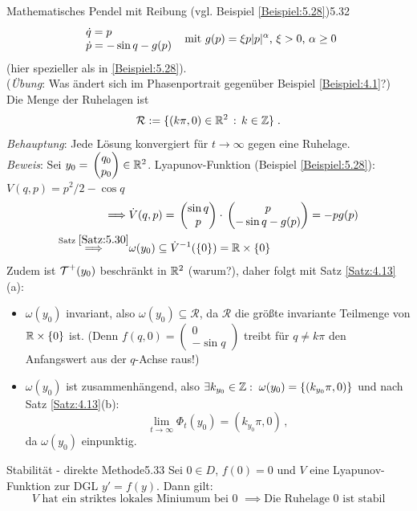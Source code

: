 \documentclass[a4paper]{article}
\begin{document}
\begin{Beispiel}{Mathematisches Pendel mit Reibung (vgl. Beispiel \ref{Beispiel:5.28})}{5.32}
\[
\begin{array}{l}
\dot{q}=p\\
\dot{p}=-\sin q-g(p)
\end{array}
\te{ mit $g(p)=\xi p|p|^{\alpha}$, $\xi>0$, $\alpha\ge 0$}
\]
(hier spezieller als in \ref{Beispiel:5.28}).\\
(\textit{Übung}: Was ändert sich im Phasenportrait gegenüber Beispiel \ref{Beispiel:4.1}?)\\
Die Menge der Ruhelagen ist
\[\mathcal{R}:=\{(k\pi,0)\in\mathbb R^2\,:\,k\in\operatorname{\mathbb Z}\}\;.\]
\textit{Behauptung}: Jede Lösung konvergiert für $t\to\infty$ gegen eine Ruhelage.\\
\textit{Beweis}: Sei $y_0=\mathop{}\begin{pmatrix}q_0\\p_0\end{pmatrix}\in\mathbb R^2$. Lyapunov-Funktion (Beispiel \ref{Beispiel:5.28}): $V(q,p)=p^2/2-\cos q$
\begin{align*}
\implies& \dot{V}(q,p)=\mathop{}\begin{pmatrix}\sin q\\p\end{pmatrix}\cdot \mathop{}\begin{pmatrix}p\\-\sin q-g(p)\end{pmatrix}=-pg(p)\\
\overset{\text{Satz } \ref{Satz:5.30}}{\implies}&\omega(y_0)\subseteq \dot{V}^{-1}(\{0\})=\mathbb R\times \{0\}
\end{align*}
Zudem ist $\operatorname{\mathcal{T}}^+(y_0)$ beschränkt in $\mathbb R^2$ (warum?), daher folgt mit Satz \ref{Satz:4.13}(a):
\begin{itemize}
\item $\omega(y_0)$ invariant, also $\omega(y_0)\subseteq \mathcal{R}$, da $\mathcal{R}$ die größte invariante Teilmenge von $\mathbb R\times\{0\}$ ist. (Denn $f(q,0)=(\begin{smallmatrix}0\\-\sin  q\end{smallmatrix})$ treibt für $q\ne k\pi$ den Anfangswert aus der $q$-Achse raus!)
\item $\omega(y_0)$ ist zusammenhängend, also $\exists k_{y_0}\in \operatorname{\mathbb Z}:\;\omega(y_0)=\{(k_{y_0}\pi,0)\}$ und nach Satz \ref{Satz:4.13}(b): \[\lim_{t\to\infty}\Phi_t(y_0)=(k_{y_0}\pi,0)\,,\]
 da $\omega(y_0)$ einpunktig.
\end{itemize}
\end{Beispiel}

\begin{Satz}{Stabilität - direkte Methode}{5.33}
Sei $0\in D$, $f(0)=0$ und $V$ eine Lyapunov-Funktion zur DGL $y'=f(y)$. Dann gilt:
\[\text{$V$ hat ein striktes lokales Miniumum bei 0 }\implies \text{Die Ruhelage 0 ist stabil}\]
\end{Satz}
\end{document}

